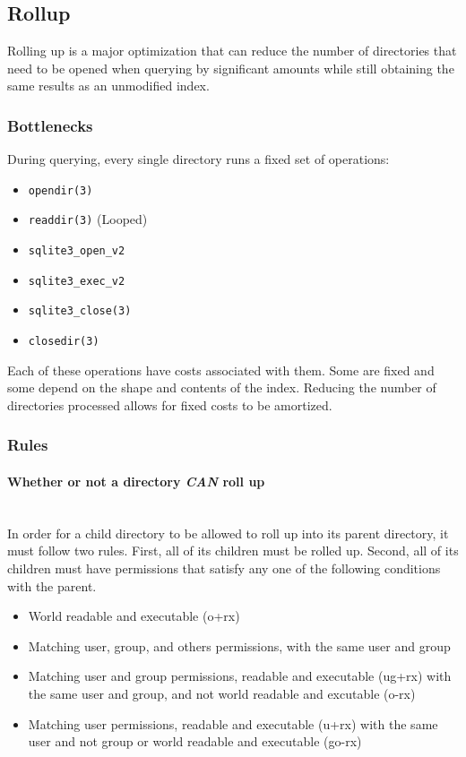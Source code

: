 \subsection{Rollup}
\label{sec:rollup}
Rolling up is a major optimization that can reduce the number of
directories that need to be opened when querying by significant
amounts while still obtaining the same results as an unmodified index.

\subsubsection{Bottlenecks}
\label{subsec:bottlenecks}
During querying, every single directory runs a fixed set of
operations:

\begin{itemize}
  \item \texttt{opendir(3)}
  \item \texttt{readdir(3)} (Looped)
  \item \texttt{sqlite3\_open\_v2}
  \item \texttt{sqlite3\_exec\_v2}
  \item \texttt{sqlite3\_close(3)}
  \item \texttt{closedir(3)}
\end{itemize}

Each of these operations have costs associated with them. Some are
fixed and some depend on the shape and contents of the index. Reducing
the number of directories processed allows for fixed costs to be
amortized.

\subsubsection{Rules}
\label{sec:rolluprules}
\paragraph{Whether or not a directory {\it CAN} roll up} ~\\
In order for a child directory to be allowed to roll up into its
parent directory, it must follow two rules. First, all of its children
must be rolled up. Second, all of its children must have permissions
that satisfy any one of the following conditions with the parent.

\begin{itemize}
  \item World readable and executable (o+rx)
  \item Matching user, group, and others permissions, with the same
    user and group
  \item Matching user and group permissions, readable and executable
    (ug+rx) with the same user and group, and not world readable and
    excutable (o-rx)
  \item Matching user permissions, readable and executable (u+rx) with
    the same user and not group or world readable and executable
    (go-rx)
\end{itemize}

